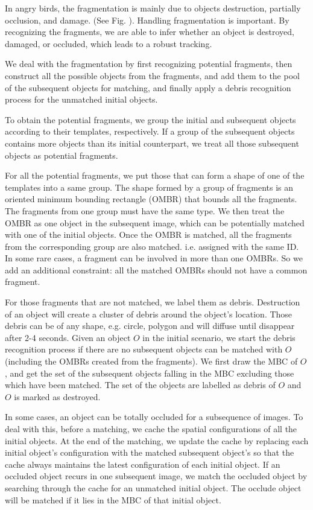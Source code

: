\documentclass[letterpaper]{article}
\begin{document}
In angry birds, the fragmentation is mainly due to objects destruction, partially occlusion, and damage. (See Fig. ). Handling fragmentation is important. By recognizing the fragments, we are able to infer whether an object is destroyed, damaged, or occluded, which leads to a robust tracking.

We deal with the fragmentation by first recognizing potential fragments, then construct all the possible objects from the fragments, and add them to the pool of the subsequent objects for matching, and finally apply a debris recognition process for the unmatched initial objects. 

To obtain the potential fragments, we group the initial and subsequent objects according to their templates, respectively. If a group of the subsequent objects contains more objects than its initial counterpart, we treat all those subsequent objects as potential fragments.  

For all the potential fragments, we put those that can form a shape of one of the templates into a same group. The shape formed by a group of fragments is an oriented minimum bounding rectangle (OMBR) that bounds all the fragments. The fragments from one group must have the same type. We then treat the OMBR as one object in the subsequent image, which can be potentially matched with one of the initial objects. Once the OMBR is matched, all the fragments from the corresponding group are also matched. i.e. assigned with the same ID. In some rare cases, a fragment can be involved in more than one OMBRs. So we add an additional constraint: all the matched OMBRs should not have a common fragment. 

For those fragments that are not matched, we label them as debris. Destruction of an object will create a cluster of debris around the object's location. Those debris can be of any shape, e.g. circle, polygon and will diffuse until disappear after 2-4 seconds. Given an object $O$ in the initial scenario, we start the debris recognition process if there are no subsequent objects can be matched with $O$ (including the OMBRs created from the fragments). We first draw the MBC of $O$, and get the set of the subsequent objects falling in the MBC excluding those which have been matched. The set of the objects are labelled as debris of $O$ and $O$ is marked as destroyed. 

In some cases, an object can be totally occluded for a subsequence of images. To deal with this, before a matching, we cache the spatial configurations of all the initial objects. At the end of the matching, we update the cache by replacing each initial object's configuration with the matched subsequent object's so that the cache always maintains the latest configuration of each initial object. If an occluded object recurs in one subsequent image, we match the occluded object by searching through the cache for an unmatched initial object. The occlude object will be matched if it lies in the MBC of that initial object. 
  
\end{document}
